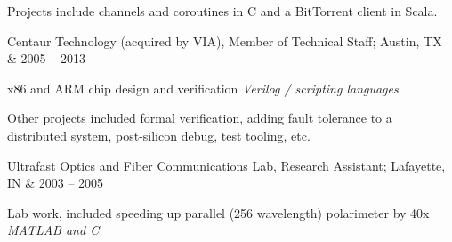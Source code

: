 \documentclass[letterpaper]{scrartcl}
\begin{document}
\begin{list1}
  \begin{list2}
  \item Projects include channels and coroutines in C and a BitTorrent client in Scala.
  \end{list2}
\item \begin{tabular1bold} Centaur Technology (acquired by VIA), Member of Technical Staff; Austin, TX & 2005 -- 2013 \end{tabular1bold}

  \begin{list2}


  \item x86 and ARM chip design and verification \hfill \emph{Verilog / scripting languages}

  \item Other projects included formal verification, adding fault tolerance to a distributed system, post-silicon debug, test tooling, etc.

  \end{list2}

\item \begin{tabular1bold} Ultrafast Optics and Fiber Communications Lab, Research Assistant; Lafayette, IN & 2003 -- 2005 \end{tabular1bold}

  \begin{list2}
  \item Lab work, included speeding up parallel (256 wavelength) polarimeter by 40x  \hfill \emph{MATLAB and C}
  \end{list2}


\end{list1}
\end{document}
